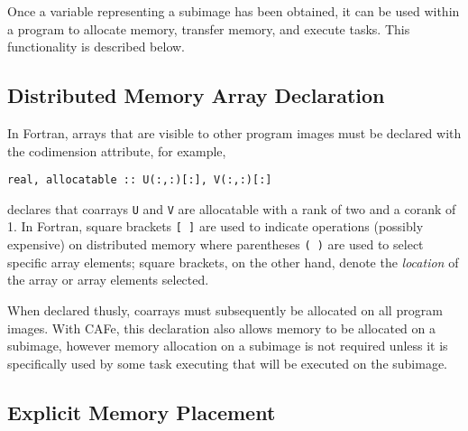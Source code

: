Once a variable representing a subimage has been obtained, it can be used within a program
to allocate memory, transfer memory, and execute tasks.  This functionality is described below.


\subsection{Distributed Memory Array Declaration}

In Fortran, arrays that are visible to other program images must be declared with the
codimension attribute, for example,
\begin{verbatim}
real, allocatable :: U(:,:)[:], V(:,:)[:]
\end{verbatim}
declares that coarrays \texttt{U} and \texttt{V} are allocatable with a rank of two and a
corank of 1.  In Fortran, square brackets \texttt{[ ]} are used to indicate operations
(possibly expensive) on distributed memory where parentheses \texttt{( )} are used to
select specific array elements; square brackets, on the other hand, denote the
\emph{location} of the array or array elements selected.

When declared thusly, coarrays must subsequently be allocated on all program images.  With
CAFe, this declaration also allows memory to be allocated on a subimage, however memory
allocation on a subimage is not required unless it is specifically used by some task
executing that will be executed on the subimage.


\subsection{Explicit Memory Placement}

